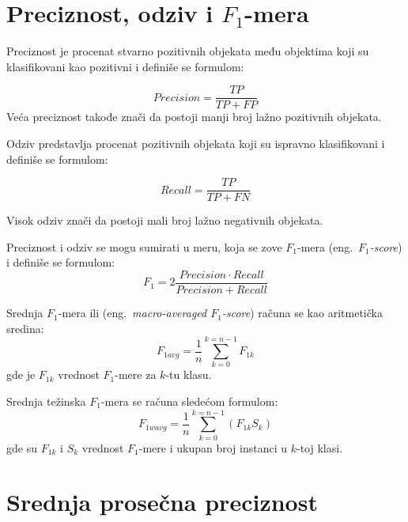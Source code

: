 \documentclass[12pt,oneside]{memoir}
\begin{document}
\section{Preciznost, odziv i \texorpdfstring{$F_1$}{TEXT}-mera}
Preciznost je procenat stvarno pozitivnih objekata među objektima koji su klasifikovani kao pozitivni i definiše se formulom:

\begin{equation}
    Precision = \frac{TP}{TP+FP}
\end{equation}
Veća preciznost takođe znači da postoji manji broj lažno pozitivnih objekata.

Odziv predstavlja procenat pozitivnih objekata koji su ispravno klasifikovani i definiše se formulom:

\begin{equation}
    Recall = \frac{TP}{TP+FN}
\end{equation}

Visok odziv znači da postoji mali broj lažno negativnih objekata.

Preciznost i odziv se mogu sumirati u meru, koja se zove $F_1$-mera (eng.~\textit{$F_1$-score}) i definiše se formulom:
\begin{equation}
\label{eq:f1}
    F_1 = 2\frac{Precision \cdot Recall}{Precision+Recall}
\end{equation}

Srednja $F_1$-mera ili (eng.~\textit{macro-averaged $F_1$-score}) računa se kao aritmetička sredina:
\begin{equation}
\label{eq:f1a}
    F_{1avg} = \frac{1}{n}\sum_{k=0}^{k=n-1} F_{1k}
\end{equation}
gde je \(F_{1k}\) vrednost $F_1$-mere za \(k\)-tu klasu.

Srednja težinska $F_1$-mera se računa sledećom formulom:
\begin{equation}
\label{eq:f1wa}
    F_{1wavg} = \frac{1}{n}\sum_{k=0}^{k=n-1} (F_{1k} S_{k})
\end{equation}
gde su \(F_{1k}\) i \(S_{k}\) vrednost $F_1$-mere i ukupan broj instanci u \(k\)-toj klasi.

\section{Srednja prosečna preciznost}
\label{section4_avgprecision}
\end{document}
